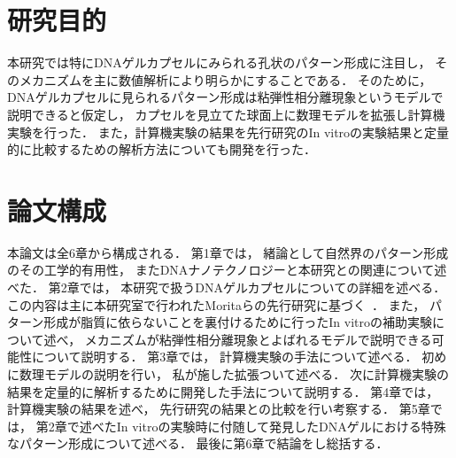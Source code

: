 \section{研究目的}
本研究では特にDNAゲルカプセルにみられる孔状のパターン形成に注目し，
そのメカニズムを主に数値解析により明らかにすることである．
そのために，
DNAゲルカプセルに見られるパターン形成は粘弾性相分離現象というモデルで説明できると仮定し，
カプセルを見立てた球面上に数理モデルを拡張し計算機実験を行った．
また，計算機実験の結果を先行研究のIn vitroの実験結果と定量的に比較するための解析方法についても開発を行った．


\section{論文構成}
本論文は全6章から構成される．
第1章では，
緒論として自然界のパターン形成のその工学的有用性，
またDNAナノテクノロジーと本研究との関連について述べた．
第2章では，
本研究で扱うDNAゲルカプセルについての詳細を述べる．
この内容は主に本研究室で行われたMoritaらの先行研究に基づく~\cite{morita2017formation}．
また，
パターン形成が脂質に依らないことを裏付けるために行ったIn vitroの補助実験について述べ，
メカニズムが粘弾性相分離現象とよばれるモデルで説明できる可能性について説明する．
第3章では，
計算機実験の手法について述べる．
初めに数理モデルの説明を行い，
私が施した拡張ついて述べる．
次に計算機実験の結果を定量的に解析するために開発した手法について説明する．
第4章では，
計算機実験の結果を述べ，
先行研究の結果との比較を行い考察する．
第5章では，
第2章で述べたIn vitroの実験時に付随して発見したDNAゲルにおける特殊なパターン形成について述べる．
最後に第6章で結論をし総括する．
